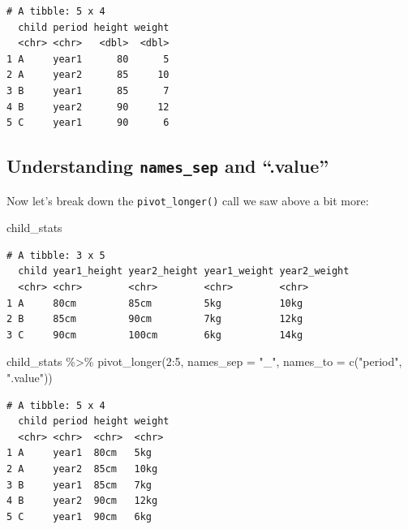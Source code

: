 \documentclass[
  letterpaper,
  DIV=11,
  numbers=noendperiod]{scrreprt}
\newenvironment{Shaded}{\begin{snugshade}}{\end{snugshade}}
\newcommand{\AttributeTok}[1]{\textcolor[rgb]{0.40,0.45,0.13}{#1}}
\newcommand{\DecValTok}[1]{\textcolor[rgb]{0.68,0.00,0.00}{#1}}
\newcommand{\FunctionTok}[1]{\textcolor[rgb]{0.28,0.35,0.67}{#1}}
\newcommand{\NormalTok}[1]{\textcolor[rgb]{0.00,0.23,0.31}{#1}}
\newcommand{\SpecialCharTok}[1]{\textcolor[rgb]{0.37,0.37,0.37}{#1}}
\newcommand{\StringTok}[1]{\textcolor[rgb]{0.13,0.47,0.30}{#1}}
\begin{document}
\begin{tcolorbox}
\begin{verbatim}
# A tibble: 5 x 4
  child period height weight
  <chr> <chr>   <dbl>  <dbl>
1 A     year1      80      5
2 A     year2      85     10
3 B     year1      85      7
4 B     year2      90     12
5 C     year1      90      6
\end{verbatim}

\end{tcolorbox}

\subsection{\texorpdfstring{Understanding \texttt{names\_sep} and
``.value''}{Understanding names\_sep and ``.value''}}\label{understanding-names_sep-and-.value}

Now let's break down the \texttt{pivot\_longer()} call we saw above a
bit more:

\begin{Shaded}
\begin{Highlighting}[]
\NormalTok{child\_stats}
\end{Highlighting}
\end{Shaded}

\begin{verbatim}
# A tibble: 3 x 5
  child year1_height year2_height year1_weight year2_weight
  <chr> <chr>        <chr>        <chr>        <chr>       
1 A     80cm         85cm         5kg          10kg        
2 B     85cm         90cm         7kg          12kg        
3 C     90cm         100cm        6kg          14kg        
\end{verbatim}

\begin{Shaded}
\begin{Highlighting}[]
\NormalTok{child\_stats }\SpecialCharTok{\%\textgreater{}\%} 
  \FunctionTok{pivot\_longer}\NormalTok{(}\DecValTok{2}\SpecialCharTok{:}\DecValTok{5}\NormalTok{, }
               \AttributeTok{names\_sep =} \StringTok{"\_"}\NormalTok{,}
               \AttributeTok{names\_to =} \FunctionTok{c}\NormalTok{(}\StringTok{"period"}\NormalTok{, }\StringTok{".value"}\NormalTok{))}
\end{Highlighting}
\end{Shaded}

\begin{verbatim}
# A tibble: 5 x 4
  child period height weight
  <chr> <chr>  <chr>  <chr> 
1 A     year1  80cm   5kg   
2 A     year2  85cm   10kg  
3 B     year1  85cm   7kg   
4 B     year2  90cm   12kg  
5 C     year1  90cm   6kg   
\end{verbatim}
\end{document}
